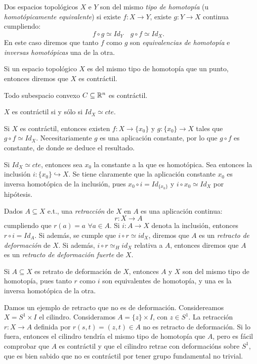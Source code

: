 \documentclass[HS.tex]{subfiles}
\begin{document}
\begin{defi}
Dos espacios topológicos $X$ e $Y$ son del mismo \emph{tipo de homotopía} (u \emph{homotópicamente equivalente}) si existe $f \colon X \to Y$, existe $g \colon Y \to X$ continua cumpliendo:
\[ f \circ g \simeq Id_Y \quad g \circ f \simeq Id_X. \]
En este caso diremos que tanto $f$ como $g$ son \emph{equivalencias de homotopía} e \emph{inversas homotópicas} una de la otra.
\end{defi}

\begin{defi}
Si un espacio topológico $X$ es del mismo tipo de homotopía que un punto, entonces diremos que $X$ es contráctil.
\end{defi}
\begin{ej}
Todo subespacio convexo $C \subseteq \mathbb{R}^n$ es contráctil.
\end{ej}
\begin{prop}
$X$ es contráctil si y sólo si $Id_X \simeq cte$.
\end{prop}
\begin{dem}
Si $X$ es contráctil, entonces existen $f:X\to \{x_0\}$ y $g:\{x_0\}\to X$ tales que $g\circ f\simeq Id_X$. Necesitariamente $g$ es una aplicación constante, por lo que $g\circ f$ es constante, de donde se deduce el resultado.

Si $Id_X \simeq cte$, entonces sea $x_0$ la constante a la que es homotópica. Sea entonces la inclusión $i:\{x_0\}\hookrightarrow X$. Se tiene claramente que la aplicación constante $x_0$ es inversa homotópica de la inclusión, pues $x_0\circ i=Id_{\{x_0\}}$ y $i\circ x_0\simeq Id_X$ por hipótesis. \QED
\end{dem}

\begin{defi}
Dados $A \subseteq X$ e.t., una \emph{retracción} de $X$ en $A$ es una aplicación continua:
\[ r \colon X \to A \]
cumpliendo que $r(a) = a$ $\forall a \in A$.
Si $i \colon A \to X$ denota la inclusión, entonces $r \circ i = Id_A$.
Si además, se cumple que $i \circ r \simeq id_X$, diremos que $A$ es un \emph{retracto de deformación} de $X$.
Si además, $i \circ r \simeq_H id_X$ relativa a $A$, entonces diremos que $A$ es un \emph{retracto de deformación fuerte} de $X$.
\end{defi}

\begin{nota}
Si $A \subseteq X$ es retrato de deformación de $X$, entonces $A$ y $X$ son del mismo tipo de homotopía, pues tanto $r$ como $i$ son equivalentes de homotopía, y una es la inversa homotópica de la otra.
\end{nota}
\begin{ej}
Damos un ejemplo de retracto que no es de deformación.
Considereamos $X = S^1 \times I$ el cilindro. Consideramos $A = \{z\} \times I$, con $z \in S^1$.
La retracción $r \colon X \to A$ definida por $r(s,t) = (z,t) \in A$ no es retracto de deformación. Si lo fuera, entonces el cilindro tendría el mismo tipo de homotopía que $A$, pero es fácil comprobar que $A$ es contráctil y que el cilindro retrae con deformacións sobre $S^1$, que es bien sabido que no es contráctil por tener grupo fundamental no trivial.
\end{ej}
\end{document}
